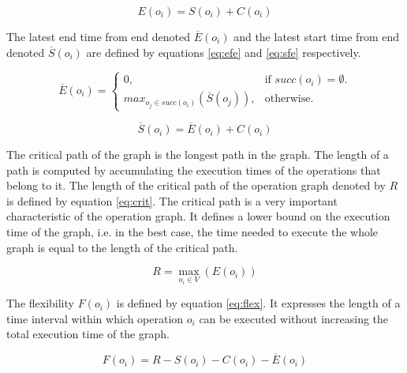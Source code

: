 \begin{equation}
	E(o_i)=S(o_i)+C(o_i) 
	\label{eq:efs}
\end{equation}

The latest end time from end denoted $\overline{E}(o_i)$ and the latest start time from end denoted $\overline{S}(o_i)$ are defined by equations \ref{eq:efe} and \ref{eq:sfe} respectively. %

\begin{equation}
\overline{E}(o_i)=\begin{cases}
    0, & \text{if $succ(o_i)=\emptyset$}.\\
    max_{o_j \in succ(o_i)}(\overline{S}(o_j)), & \text{otherwise}.
  \end{cases}
	\label{eq:efe}
\end{equation}

\begin{equation}
	\overline{S}(o_i)=\overline{E}(o_i)+C(o_i) 
	\label{eq:sfe}
\end{equation}

The critical path of the graph is the longest path in the graph. The length of a path is computed by accumulating the execution times of the operations that belong to it. The length of the critical path of the operation graph denoted by $R$ is defined by equation \ref{eq:crit}. The critical path is a very important characteristic of the operation graph. It defines a lower bound on the execution time of the graph, i.e. in the best case, the time needed to execute the whole graph is equal to the length of the critical path. 

\begin{equation}
	R = \max_{o_i \in V}(E(o_i)) 
	\label{eq:crit}
\end{equation}
 
The flexibility $F(o_i)$ is defined by equation \ref{eq:flex}. It expresses the length of a time interval within which operation $o_i$ can be executed without increasing the total execution time of the graph.

\begin{equation}
	F(o_i) = R - S(o_i) - C(o_i) - \overline{E}(o_i) 
	\label{eq:flex}
\end{equation}

